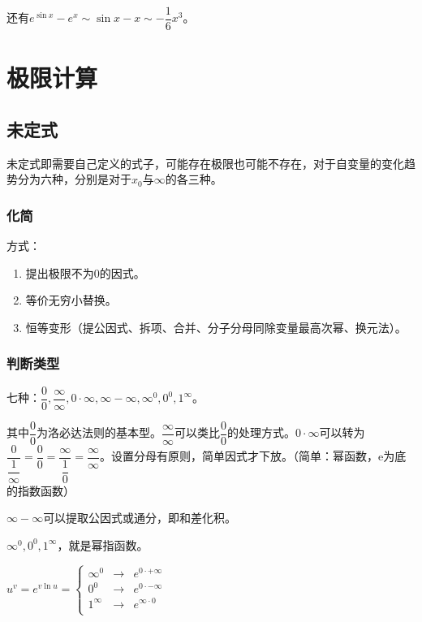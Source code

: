 \documentclass[UTF8]{ctexart}
\begin{document}
还有$e^{\sin x}-e^x\sim\sin x-x\sim-\dfrac{1}{6}x^3$。

\section{极限计算}

\subsection{未定式}

未定式即需要自己定义的式子，可能存在极限也可能不存在，对于自变量的变化趋势分为六种，分别是对于$x_0$与$\infty$的各三种。

\subsubsection{化简}

方式：

\begin{enumerate}
    \item 提出极限不为0的因式。
    \item 等价无穷小替换。
    \item 恒等变形（提公因式、拆项、合并、分子分母同除变量最高次幂、换元法）。
\end{enumerate}

\subsubsection{判断类型}

七种：$\dfrac{0}{0},\dfrac{\infty}{\infty},0\cdot\infty,\infty-\infty,\infty^0,0^0,1^\infty$。

其中$\dfrac{0}{0}$为洛必达法则的基本型。$\dfrac{\infty}{\infty}$可以类比$\dfrac{0}{0}$的处理方式。$0\cdot\infty$可以转为$\dfrac{0}{\dfrac{1}{\infty}}=\dfrac{0}{0}=\dfrac{\infty}{\dfrac{1}{0}}=\dfrac{\infty}{\infty}$。设置分母有原则，简单因式才下放。（简单：幂函数，e为底的指数函数）

$\infty-\infty$可以提取公因式或通分，即和差化积。

$\infty^0,0^0,1^\infty$，就是幂指函数。

$
u^v=e^{v\ln u}=\left\{
\begin{array}{lcl}
    \infty^0 & \rightarrow & e^{0\cdot+\infty} \\
    0^0 & \rightarrow & e^{0\cdot-\infty} \\
    1^\infty & \rightarrow & e^{\infty\cdot 0} \\
\end{array} \right.
$
\end{document}
